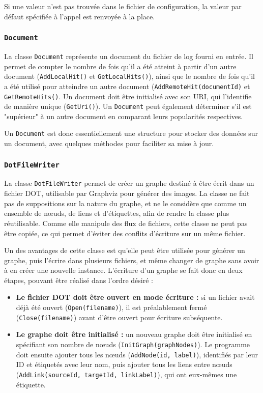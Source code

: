 \documentclass[11pt,a4paper]{article}
\begin{document}
	Si une valeur n'est pas trouvée dans le fichier de configuration, la valeur par défaut spécifiée à l'appel est renvoyée à la place.
	
	\subsubsection{\texttt{Document}}
	
	La classe \texttt{Document} représente un document du fichier de log fourni en entrée. Il permet de compter le nombre de fois qu'il a été atteint à partir d'un autre document (\texttt{AddLocalHit()} et \texttt{GetLocalHits()}), ainsi que le nombre de fois qu'il a été utilisé pour atteindre un autre document (\texttt{AddRemoteHit(documentId)} et \texttt{GetRemoteHits()}. Un document doit être initialisé avec son URI, qui l'identifie de manière unique (\texttt{GetUri()}). Un \texttt{Document} peut également déterminer s'il est "supérieur" à un autre document en comparant leurs popularités respectives.
	
	Un \texttt{Document} est donc essentiellement une structure pour stocker des données sur un document, avec quelques méthodes pour faciliter sa mise à jour.
	
	\subsubsection{\texttt{DotFileWriter}}
	
	La classe \texttt{DotFileWriter} permet de créer un graphe destiné à être écrit dans un fichier DOT, utilisable par Graphviz pour générer des images. La classe ne fait pas de suppositions sur la nature du graphe, et ne le considère que comme un ensemble de nœuds, de liens et d'étiquettes, afin de rendre la classe plus réutilisable. Comme elle manipule des flux de fichiers, cette classe ne peut pas être copiée, ce qui permet d'éviter des conflits d'écriture sur un même fichier.
	
	Un des avantages de cette classe est qu'elle peut être utilisée pour générer un graphe, puis l'écrire dans plusieurs fichiers, et même changer de graphe sans avoir à en créer une nouvelle instance. L'écriture d'un graphe se fait donc en deux étapes, pouvant être réalisé dans l'ordre désiré :
	
	\begin{itemize}
		\item \textbf{Le fichier DOT doit être ouvert en mode écriture :} si un fichier avait déjà été ouvert (\texttt{Open(filename)}), il est préalablement fermé (\texttt{Close(filename)}) avant d'être ouvert pour écriture subséquente.
		\item \textbf{Le graphe doit être initialisé :} un nouveau graphe doit être initialisé en spécifiant son nombre de nœuds (\texttt{InitGraph(graphNodes)}). Le programme doit ensuite ajouter tous les nœuds (\texttt{AddNode(id, label)}), identifiés par leur ID et étiquetés avec leur nom, puis ajouter tous les liens entre nœuds (\texttt{AddLink(sourceId, targetId, linkLabel)}), qui ont eux-mêmes une étiquette.
	\end{itemize}
	
\end{document}
